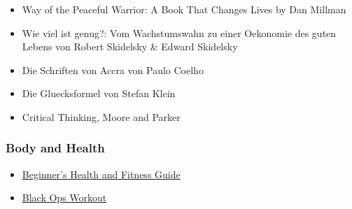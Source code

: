 \begin{itemize}
	\item Way of the Peaceful Warrior: A Book That Changes Lives by Dan Millman

	\item Wie viel ist genug?: Vom Wachstumswahn zu einer Oekonomie des guten Lebens von Robert Skidelsky \& Edward Skidelsky

	\item Die Schriften von Accra von Paulo Coelho

	\item Die Gluecksformel von Stefan Klein

	\item Critical Thinking, Moore and Parker

\end{itemize}

\subsubsection{Body and Health}

\begin{itemize}
  \item \href{http://liamrosen.com/fitness.html}{Beginner's Health and Fitness Guide}

  \item \href{http://darebee.com/workouts/black-ops-workout.html}{Black Ops Workout}

\end{itemize}

